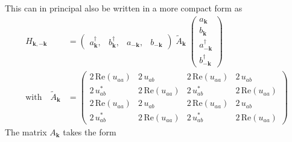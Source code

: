 This can in principal also be written in a more compact form as
\begin{align*}
    H_{\mathbf{k},-\mathbf{k}} &= \begin{pmatrix} a_\mathbf{k}^{\dagger}, & b_\mathbf{k}^{\dagger}, & a_{-\mathbf{k}}, & b_{-\mathbf{k}} \end{pmatrix}
      \;\tilde{A}_{\mathbf{k}}\;
      \begin{pmatrix} a_\mathbf{k} \\ b_\mathbf{k} \\ a_{-\mathbf{k}}^{\dagger} \\ b_{-\mathbf{k}}^{\dagger} \end{pmatrix}\\
    \text{with}\quad \tilde{A}_{\mathbf{k}} &= \begin{pmatrix}
2\,\mathrm{Re}(u_{aa}) & 2\,u_{ab} & 2\,\mathrm{Re}(u_{aa}) & 2\,u_{ab} \\
2\,u_{ab}^{*} & 2\,\mathrm{Re}(u_{aa}) & 2\,u_{ab}^{*} & 2\,\mathrm{Re}(u_{aa}) \\
2\,\mathrm{Re}(u_{aa}) & 2\,u_{ab} & 2\,\mathrm{Re}(u_{aa}) & 2\,u_{ab} \\
2\,u_{ab}^{*} & 2\,\mathrm{Re}(u_{aa}) & 2\,u_{ab}^{*} & 2\,\mathrm{Re}(u_{aa})
\end{pmatrix}
\end{align*}
The matrix $A_\mathbf{k}$ takes the form
